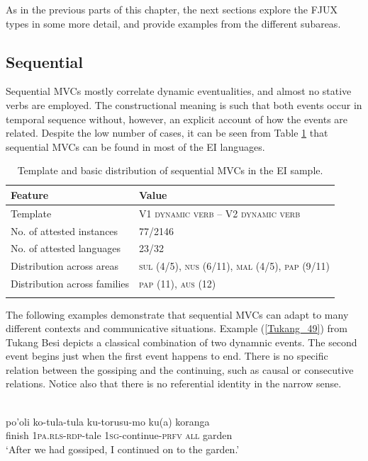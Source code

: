 As in the previous parts of this chapter, the next sections explore the FJUX types in some more detail, and provide examples from the different subareas.

\subsection{Sequential}

Sequential MVCs mostly correlate dynamic eventualities, and almost no stative verbs are employed. The constructional meaning is such that both events occur in temporal sequence without, however, an explicit account of how the events are related. Despite the low number of cases, it can be seen from Table \ref{table:sequential} that sequential MVCs can be found in most of the EI languages.

\begin{table}
\begin{tabular}{ll}
\lsptoprule
Feature&Value\tabularnewline
\midrule
Template& V1 \textsc{dynamic verb} -- V2 \textsc{dynamic verb}\tabularnewline
No. of attested instances& 77/2146 \tabularnewline
No. of attested languages& 23/32 \tabularnewline
Distribution across areas& \textsc{sul} (4/5), \textsc{nus} (6/11), \textsc{mal} (4/5), \textsc{pap} (9/11) \tabularnewline
Distribution across families& \textsc{pap} (11), \textsc{aus} (12) \tabularnewline
\lspbottomrule
\end{tabular}
\caption[Template and basic distribution of sequential MVCs]{Template and basic distribution of sequential MVCs in the EI sample.}
\label{table:sequential}
\end{table}

The following examples demonstrate that sequential MVCs can adapt to many different contexts and communicative situations. Example (\ref{Tukang_49}) from Tukang Besi depicts a classical combination of two dynamnic events. The second event begins just when the first event happens to end. There is no specific relation between the gossiping and the continuing, such as causal or consecutive relations. Notice also that there is no referential identity in the narrow sense. 

\ea \label{Tukang_49}
\\
\gll po'oli ko-tula-tula ku-torusu-mo ku(a) koranga \\
finish 1\textsc{pa}.\textsc{rls}-\textsc{rdp}-tale 1\textsc{sg}-continue-\textsc{prfv} \textsc{all} garden \\
\glft `After we had gossiped, I continued on to the garden.'\\ 
\z

